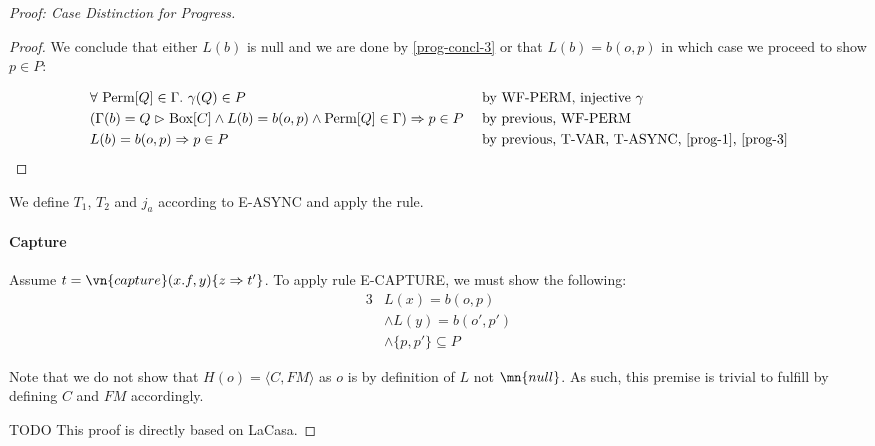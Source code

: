 \begin{proof}[Proof: Case Distinction for Progress]
\begin{proof}
We conclude that either $L(b)$ is null and we are done by \cref{prog-concl-3} or that $L(b) = b(o,p)$ in which case we proceed to show $p \in P$:

\begin{alignat}{2}
        &\forall \text{ Perm}[Q] \in \Gamma.\ \gamma(Q) \in P && \text{ by WF-PERM, injective $\gamma$}\\
        &(\Gamma(b) = Q \vartriangleright \text{Box}[C] \wedge L(b) = b(o, p) \wedge \text{Perm}[Q] \in \Gamma) \Rightarrow p \in P && \text{ by previous, WF-PERM}\\
        &L(b) = b(o,p) \Rightarrow p \in P && \text{ by previous, T-VAR, T-ASYNC, \cref{prog-1}, \cref{prog-3}}
\end{alignat}
\end{proof}

We define $T_1$, $T_2$ and $j_a$ according to E-ASYNC and apply the rule.

\paragraph{Capture}
Assume $t = \vn{capture}(x.f, y)\{ z \Rightarrow t' \}$. To apply rule E-CAPTURE, we must show the following:
\begin{alignat}{3}
    & L(x) = b(o,p) \label{prog-capt-c1}\\
    & \wedge L(y) = b(o',p') \label{prog-capt-c2}\\
    & \wedge \{p, p'\} \subseteq P \label{prog-capt-c3}
\end{alignat}

Note that we do not show that $H(o) = \langle C, FM \rangle$ as $o$ is by definition of $L$ not $\mn{null}$. As such, this premise is trivial to fulfill by defining $C$ and $FM$ accordingly.

TODO This proof is directly based on LaCasa.


\end{proof}
